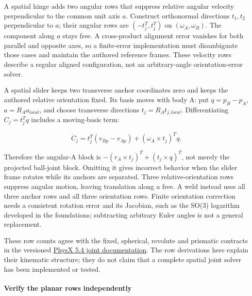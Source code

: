 A spatial hinge adds two angular rows that suppress relative angular velocity perpendicular to the common unit axis \(a\). Construct orthonormal directions \(t_1,t_2\) perpendicular to \(a\); their angular rows are \((-t_j^T,t_j^T)\) on \((\omega_A,\omega_B)\). The component along \(a\) stays free. A cross-product alignment error vanishes for both parallel and opposite axes, so a finite-error implementation must disambiguate those cases and maintain the authored reference frames. These velocity rows describe a regular aligned configuration, not an arbitrary-angle orientation-error solver.

A spatial slider keeps two transverse anchor coordinates zero and keeps the authored relative orientation fixed. Its basis moves with body A: put \(q=p_B-p_A\), \(a=R_Aa_{local}\), and choose transverse directions \(t_j=R_At_{j,local}\). Differentiating \(C_j=t_j^Tq\) includes a moving-basis term:

\[
\dot C_j=t_j^T(v_{Bp}-v_{Ap})+(\omega_A\times t_j)^Tq.
\]

Therefore the angular-A block is \(-(r_A\times t_j)^T+(t_j\times q)^T\), not merely the projected ball-joint block. Omitting it gives incorrect behavior when the slider frame rotates while its anchors are separated. Three relative-orientation rows suppress angular motion, leaving translation along \(a\) free. A weld instead uses all three anchor rows and all three orientation rows. Finite orientation correction needs a consistent rotation error and its Jacobian, such as the SO(3) logarithm developed in the foundations; subtracting arbitrary Euler angles is not a general replacement.

These row counts agree with the fixed, spherical, revolute and prismatic contracts in the versioned \href{https://nvidia-omniverse.github.io/PhysX/physx/5.4.0/docs/Joints.html}{PhysX 5.4 joint documentation}. The row derivations here explain their kinematic structure; they do not claim that a complete spatial joint solver has been implemented or tested.

\paragraph{Verify the planar rows independently}\label{06-engine-ii-ch033-verify-the-planar-rows-independently}

\hypertarget{06-engine-ii-ch033-verify-the-planar-rows-independently}{}

